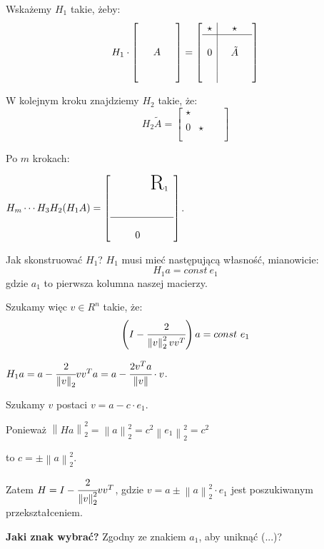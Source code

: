 \documentclass[hidelinks,a4paper,fleqn,oneside]{book}
\newcommand{\norm}[1]{\left\lVert#1\right\rVert}
\begin{document}
Wskażemy $H_1$ takie, żeby:
\[
H_1 \cdot \left[ \begin{array}{c}\\ \\ \quad A \quad \\ \\ \ \end{array} \right] = 
\left[ \begin{array}{c|c}\star & \quad \star \quad \\ \hline \\ 0 & \tilde{A}\\ & \\ & \end{array}\right]
\]

W kolejnym kroku znajdziemy $H_2$ takie, że:
\[
H_2 \tilde{A} = \left[ \begin{array}{c|c}\star & \quad  \quad \\  \\ 0 & \star \\ & \\ & \end{array}\right]
\]

Po $m$ krokach:

$H_m \cdots H_3 H_2 (H_1 A) = \left[ \begin{array}{ccc} & & \text{\huge R}_1 \\ \\ \\ \hline \\ & \quad 0 & \end{array}\right]$.

Jak skonstruować $H_1$? $H_1$ musi mieć następującą własność, mianowicie:
\[
	H_1 a = const\ e_1
\]
gdzie $a_1$ to pierwsza kolumna naszej macierzy.

Szukamy więc $v \in R^n$ takie, że:
\[
	\left(I - \cfrac{2}{\norm{v}_2^2 vv^T}\right)a = const\ e_1
\]

$H_1a = a - \cfrac{2}{\norm{v}_2} v v^Ta = a - \cfrac{2v^Ta}{\norm{v}} \cdot v$.

Szukamy $v$ postaci $v = a - c\cdot e_1$.

Ponieważ $\norm{Ha}_2^2 = \norm{a}^2_2 = c^2 \norm{e_1}^2_2 = c^2$

to $c = \pm \norm{a} ^2_2$.


Zatem $H = I - \cfrac{2}{\norm{v}_2^2} vv^T$, gdzie $v = a \pm \norm{a}_2^2 \cdot e_1$ jest poszukiwanym przekształceniem.

\textbf{Jaki znak wybrać?} Zgodny ze znakiem $a_1$, aby uniknąć (...)?
\end{document}
